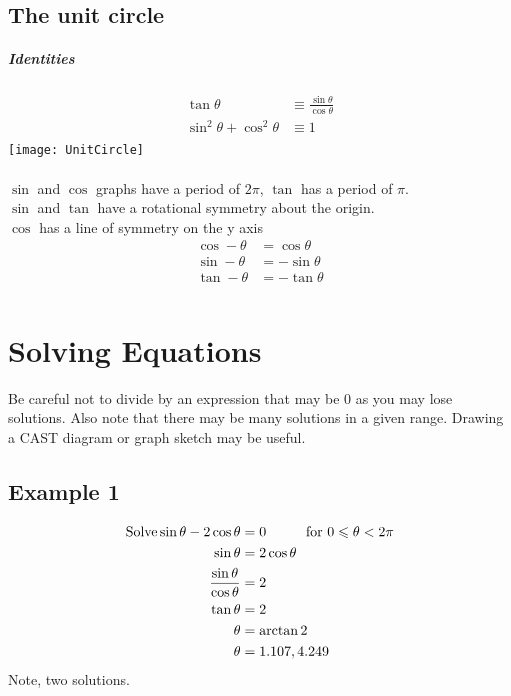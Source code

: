 \documentclass[a4paper,12pt]{article}
\begin{document}
\subsection*{The unit circle}
\subparagraph*{Identities}
\begin{align*}
\tan \theta & \equiv \frac{\sin \theta}{\cos \theta} \\
\sin^2 \theta + \cos^2 \theta & \equiv 1 \\
\end{align*}
\texttt{[image: UnitCircle]} \\\\
$\sin$ and $\cos$ graphs have a period of $2\pi$, $\tan$ has a period of $\pi$. \\
$\sin$ and $\tan$ have a rotational symmetry about the origin. \\
$\cos$ has a line of symmetry on the y axis \\
\begin{align*}
\cos - \theta & = \cos \theta \\
\sin - \theta & = - \sin \theta \\
\tan - \theta & = - \tan \theta \\ 
\end{align*}
\section*{Solving Equations}
Be careful not to divide by an expression that may be 0 as you may lose solutions. Also note that there may be many solutions in a given range. Drawing a CAST diagram or graph sketch may be useful.
\subsection*{Example 1}
\begin{align*}
\text{Solve} \sin \theta - 2 \cos \theta & = 0 \hspace*{1cm} \text{for } 0 \leqslant \theta < 2\pi \\
\sin \theta & = 2 \cos \theta \\
\frac{\sin \theta}{\cos \theta} & = 2 \\
\tan \theta & = 2 \\
\theta & = \arctan 2 \\
\theta & = 1.107, 4.249 \\
\end{align*}
Note, two solutions.
\end{document}
